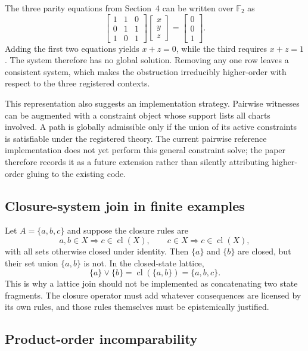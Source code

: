 \documentclass[11pt]{article}
\newcommand{\cl}{\operatorname{cl}}
\begin{document}
The three parity equations from Section~4 can be written over \(\mathbb F_2\) as
\[
\begin{bmatrix}
1&1&0\\
0&1&1\\
1&0&1
\end{bmatrix}
\begin{bmatrix}x\\y\\z\end{bmatrix}
=
\begin{bmatrix}0\\0\\1\end{bmatrix}.
\]
Adding the first two equations yields \(x+z=0\), while the third requires \(x+z=1\). The system therefore has no global solution. Removing any one row leaves a consistent system, which makes the obstruction irreducibly higher-order with respect to the three registered contexts.

This representation also suggests an implementation strategy. Pairwise witnesses can be augmented with a constraint object whose support lists all charts involved. A path is globally admissible only if the union of its active constraints is satisfiable under the registered theory. The current pairwise reference implementation does not yet perform this general constraint solve; the paper therefore records it as a future extension rather than silently attributing higher-order gluing to the existing code.

\subsection{Closure-system join in finite examples}

Let \(A=\{a,b,c\}\) and suppose the closure rules are
\[
a,b\in X\Rightarrow c\in\cl(X),
\qquad c\in X\Rightarrow c\in\cl(X),
\]
with all sets otherwise closed under identity. Then \(\{a\}\) and \(\{b\}\) are closed, but their set union \(\{a,b\}\) is not. In the closed-state lattice,
\[
\{a\}\vee\{b\}
=\cl(\{a,b\})
=\{a,b,c\}.
\]
This is why a lattice join should not be implemented as concatenating two state fragments. The closure operator must add whatever consequences are licensed by its own rules, and those rules themselves must be epistemically justified.

\subsection{Product-order incomparability}
\end{document}
